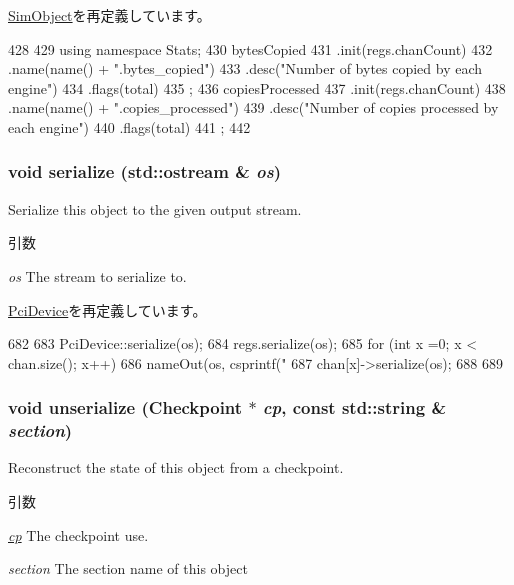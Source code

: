 \hyperlink{classSimObject_a4dc637449366fcdfc4e764cdf12d9b11}{SimObject}を再定義しています。


\begin{DoxyCode}
428 {
429     using namespace Stats;
430     bytesCopied
431         .init(regs.chanCount)
432         .name(name() + ".bytes_copied")
433         .desc("Number of bytes copied by each engine")
434         .flags(total)
435         ;
436     copiesProcessed
437         .init(regs.chanCount)
438         .name(name() + ".copies_processed")
439         .desc("Number of copies processed by each engine")
440         .flags(total)
441         ;
442 }
\end{DoxyCode}
\hypertarget{classCopyEngine_a53e036786d17361be4c7320d39c99b84}{
\subsubsection[{serialize}]{\setlength{\rightskip}{0pt plus 5cm}void serialize (std::ostream \& {\em os})}}
\label{classCopyEngine_a53e036786d17361be4c7320d39c99b84}
Serialize this object to the given output stream. 
\begin{DoxyParams}{引数}
\item[{\em os}]The stream to serialize to. \end{DoxyParams}


\hyperlink{classPciDevice_a53e036786d17361be4c7320d39c99b84}{PciDevice}を再定義しています。


\begin{DoxyCode}
682 {
683     PciDevice::serialize(os);
684     regs.serialize(os);
685     for (int x =0; x < chan.size(); x++) {
686         nameOut(os, csprintf("%
687         chan[x]->serialize(os);
688     }
689 }
\end{DoxyCode}
\hypertarget{classCopyEngine_af22e5d6d660b97db37003ac61ac4ee49}{
\subsubsection[{unserialize}]{\setlength{\rightskip}{0pt plus 5cm}void unserialize ({\bf Checkpoint} $\ast$ {\em cp}, \/  const std::string \& {\em section})}}
\label{classCopyEngine_af22e5d6d660b97db37003ac61ac4ee49}
Reconstruct the state of this object from a checkpoint. 
\begin{DoxyParams}{引数}
\item[{\em \hyperlink{namespacecp}{cp}}]The checkpoint use. \item[{\em section}]The section name of this object \end{DoxyParams}


